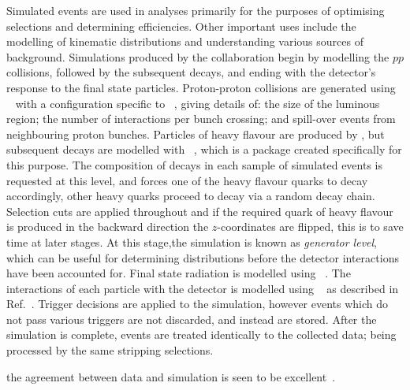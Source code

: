 Simulated events are used in \lhcb analyses primarily for the purposes of optimising selections and
determining efficiencies.
Other important uses include the modelling of kinematic distributions and understanding various
sources of background.
Simulations produced by the \lhcb collaboration begin by modelling the $pp$ collisions, followed by
the subsequent decays, and ending with the detector's response to the final state particles.
Proton-proton collisions are generated using \pythia~\cite{Sjostrand:2006za,*Sjostrand:2007gs} with
a configuration specific to \lhcb~\cite{LHCb-PROC-2010-056}, giving details of: the size of the
luminous region; the number of interactions per bunch crossing; and spill-over events from
neighbouring proton bunches.
Particles of heavy flavour are produced by \pythia, but subsequent decays are modelled with
\evtgen~\cite{Lange:2001uf}, which is a package created specifically for this purpose.
The composition of decays in each sample of simulated events is requested at this level, and
\evtgen forces one of the heavy flavour quarks to decay accordingly, other heavy quarks proceed to
decay via a random decay chain.
Selection cuts are applied throughout and if the required quark of heavy
flavour is produced in the backward direction the $z$-coordinates are flipped, this is to save time
at later stages.
At this stage,the simulation is known as \emph{generator level}, which can be useful for
determining distributions before the detector interactions have been accounted for.
Final state radiation is modelled using \photos~\cite{Golonka:2005pn}.
The interactions of each particle with the \lhcb detector is modelled using
\geant~\cite{Allison:2006ve,*Agostinelli:2002hh} as described in Ref.~\cite{LHCb-PROC-2011-006}.
Trigger decisions are applied to the simulation, however events which do not pass various triggers
are not discarded, and instead are stored.
After the simulation is complete, events are treated identically to the collected data; being
processed by the same stripping selections.


the agreement between data and simulation is seen to be excellent~\cite{LHCb-DP-2014-001}.



